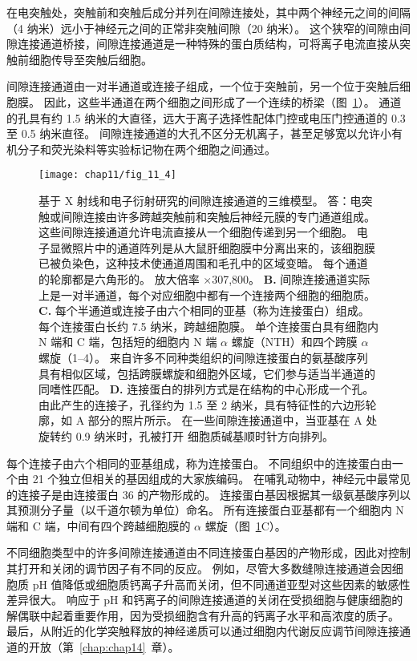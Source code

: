 在电突触处，突触前和突触后成分并列在间隙连接处，其中两个神经元之间的间隔（4 纳米）远小于神经元之间的正常非突触间隙（20 纳米）。
这个狭窄的间隙由间隙连接通道桥接，间隙连接通道是一种特殊的蛋白质结构，可将离子电流直接从突触前细胞传导至突触后细胞。


间隙连接通道由一对半通道或连接子组成，一个位于突触前，另一个位于突触后细胞膜。
因此，这些半通道在两个细胞之间形成了一个连续的桥梁（图~\ref{fig:11_4}）。
通道的孔具有约 1.5 纳米的大直径，远大于离子选择性配体门控或电压门控通道的 0.3 至 0.5 纳米直径。
间隙连接通道的大孔不区分无机离子，甚至足够宽以允许小有机分子和荧光染料等实验标记物在两个细胞之间通过。


\begin{figure}[htbp]
	\centering
	\texttt{[image: chap11/fig\_11\_4]}
	\caption{基于 X 射线和电子衍射研究的间隙连接通道的三维模型。
		答：电突触或间隙连接由许多跨越突触前和突触后神经元膜的专门通道组成。
		这些间隙连接通道允许电流直接从一个细胞传递到另一个细胞。
		电子显微照片中的通道阵列是从大鼠肝细胞膜中分离出来的，该细胞膜已被负染色，这种技术使通道周围和毛孔中的区域变暗。
		每个通道的轮廓都是六角形的。
		放大倍率 ×307,800。
		\textbf{B.} 间隙连接通道实际上是一对半通道，每个对应细胞中都有一个连接两个细胞的细胞质\cite{makowski1977gap}。 
		\textbf{C.} 每个半通道或连接子由六个相同的亚基（称为连接蛋白）组成。
		每个连接蛋白长约 7.5 纳米，跨越细胞膜。
		单个连接蛋白具有细胞内 N 端和 C 端，包括短的细胞内 N 端 $\alpha$ 螺旋（NTH）和四个跨膜 $\alpha$ 螺旋（1–4）。
		来自许多不同种类组织的间隙连接蛋白的氨基酸序列具有相似区域，包括跨膜螺旋和细胞外区域，它们参与适当半通道的同嗜性匹配。
		\textbf{D.} 连接蛋白的排列方式是在结构的中心形成一个孔。
		由此产生的连接子，孔径约为 1.5 至 2 纳米，具有特征性的六边形轮廓，如 A 部分的照片所示。
		在一些间隙连接通道中，当亚基在 A 处旋转约 0.9 纳米时，孔被打开 细胞质碱基顺时针方向排列\cite{unwin1980structure}。}
	\label{fig:11_4}
\end{figure}


每个连接子由六个相同的亚基组成，称为连接蛋白。
不同组织中的连接蛋白由一个由 21 个独立但相关的基因组成的大家族编码。
在哺乳动物中，神经元中最常见的连接子是由连接蛋白 36 的产物形成的。
连接蛋白基因根据其一级氨基酸序列以其预测分子量（以千道尔顿为单位）命名。
所有连接蛋白亚基都有一个细胞内 N 端和 C 端，中间有四个跨越细胞膜的 $\alpha$ 螺旋（图~\ref{fig:11_4}C）。


不同细胞类型中的许多间隙连接通道由不同连接蛋白基因的产物形成，因此对控制其打开和关闭的调节因子有不同的反应。
例如，尽管大多数缝隙连接通道会因细胞质 pH 值降低或细胞质钙离子升高而关闭，但不同通道亚型对这些因素的敏感性差异很大。
响应于 pH 和钙离子的间隙连接通道的关闭在受损细胞与健康细胞的解偶联中起着重要作用，因为受损细胞含有升高的钙离子水平和高浓度的质子。
最后，从附近的化学突触释放的神经递质可以通过细胞内代谢反应调节间隙连接通道的开放（第~\ref{chap:chap14}~章）。


